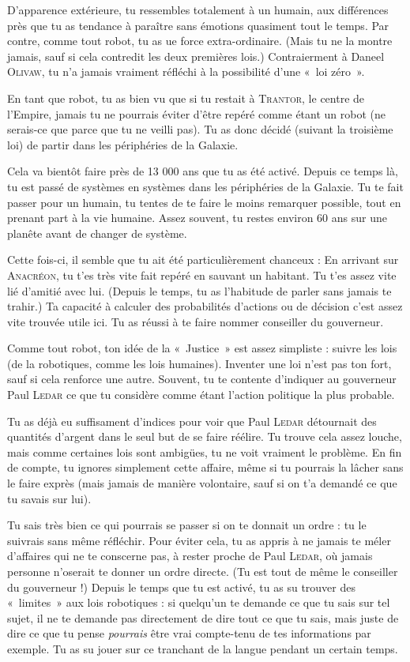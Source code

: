 \documentclass{article}
\begin{document}
{D’apparence extérieure, tu ressembles totalement à un humain, aux différences près que tu as tendance à paraître sans émotions quasiment tout le temps.
Par contre, comme tout robot, tu as ue force extra-ordinaire. (Mais tu ne la montre jamais, sauf si cela contredit les deux premières lois.)
Contraierment à Daneel \textsc{Olivaw}, tu n’a jamais vraiment réfléchi à la possibilité d’une «~loi zéro~».

En tant que robot, tu as bien vu que si tu restait à \textsc{Trantor}, le centre de l’Empire, jamais tu ne pourrais éviter d’être repéré comme étant un robot (ne serais-ce que parce que tu ne veilli pas).
Tu as donc décidé (suivant la troisième loi) de partir dans les périphéries de la Galaxie.

Cela va bientôt faire près de 13 000 ans que tu as été activé.
Depuis ce temps là, tu est passé de systèmes en systèmes dans les périphéries de la Galaxie.
Tu te fait passer pour un humain, tu tentes de te faire le moins remarquer possible, tout en prenant part à la vie humaine.
Assez souvent, tu restes environ 60 ans sur une planête avant de changer de système.

Cette fois-ci, il semble que tu ait été particulièrement chanceux :
En arrivant sur \textsc{Anacréon}, tu t’es très vite fait repéré en sauvant un habitant.
Tu t’es assez vite lié d’amitié avec lui. (Depuis le temps, tu as l’habitude de parler sans jamais te trahir.)
Ta capacité à calculer des probabilités d’actions ou de décision c’est assez vite trouvée utile ici.
Tu as réussi à te faire nommer conseiller du gouverneur.

Comme tout robot, ton idée de la «~Justice~» est assez simpliste : suivre les lois (de la robotiques, comme les lois humaines).
Inventer une loi n’est pas ton fort, sauf si cela renforce une autre.
Souvent, tu te contente d’indiquer au gouverneur Paul \textsc{Ledar} ce que tu considère comme étant l’action politique la plus probable.

Tu as déjà eu suffisament d’indices pour voir que Paul \textsc{Ledar} détournait des quantités d’argent dans le seul but de se faire réélire.
Tu trouve cela assez louche, mais comme certaines lois sont ambigües, tu ne voit vraiment le problème.
En fin de compte, tu ignores simplement cette affaire, même si tu pourrais la lâcher sans le faire exprès (mais jamais de manière volontaire, sauf si on t’a demandé ce que tu savais sur lui).

Tu sais très bien ce qui pourrais se passer si on te donnait un ordre : tu le suivrais sans même réfléchir.
Pour éviter cela, tu as appris à ne jamais te méler d’affaires qui ne te conscerne pas, à rester proche de Paul \textsc{Ledar}, où jamais personne n’oserait te donner un ordre directe. (Tu est tout de même le conseiller du gouverneur !)
Depuis le temps que tu est activé, tu as su trouver des «~limites~» aux lois robotiques : si quelqu’un te demande ce que tu sais sur tel sujet, il ne te demande pas directement de dire tout ce que tu sais, mais juste de dire ce que tu pense \emph{pourrais} être vrai compte-tenu de tes informations par exemple.
Tu as su jouer sur ce tranchant de la langue pendant un certain temps.

}
\end{document}
